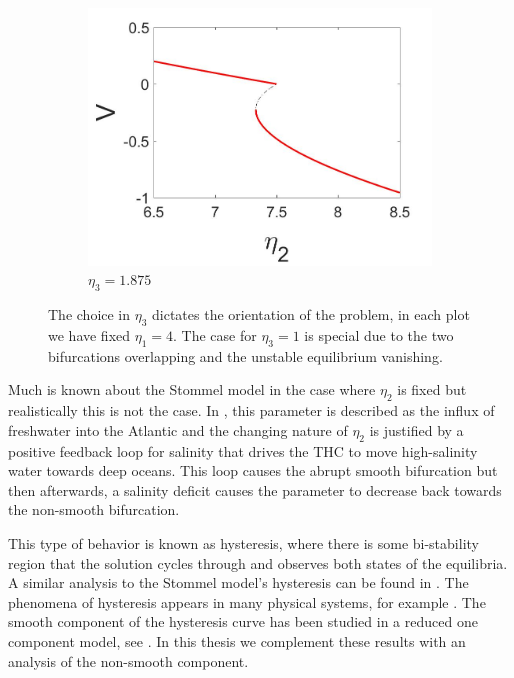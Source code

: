 \begin{figure}[H]
\begin{subfigure}{.5\textwidth}
 \includegraphics[width=\linewidth]{intro/V_bif_reverse.jpg}
 \caption{$\eta_3=1.875$}
\end{subfigure}
\caption{The choice in $\eta_3$ dictates the orientation of the problem, in each plot we have fixed $\eta_1=4$. The case for $\eta_3=1$ is special due to the two bifurcations overlapping and the unstable equilibrium vanishing.}
\label{fig:Stommel_bif_plots}
\end{figure}

\indent Much is known about the Stommel model in the case where $\eta_2$ is fixed but realistically this is not the case. In \cite{rahmstorf2000thermohaline}, this parameter is described as the influx of freshwater into the Atlantic and the changing nature of $\eta_2$ is justified by a positive feedback loop for salinity that drives the THC to move high-salinity water towards deep oceans. This loop causes the abrupt smooth bifurcation but then afterwards, a salinity deficit causes the parameter to decrease back towards the non-smooth bifurcation.

\indent This type of behavior is known as hysteresis, where there is some bi-stability region that the solution cycles through and observes both states of the equilibria. A similar analysis to the Stommel model's hysteresis can be found in \cite{roberts2017relaxation}. The phenomena of hysteresis appears in many physical systems, for example \cite{jung1990scaling,hohl1995scaling,joshi2005dynamical}. The smooth component of the hysteresis curve has been studied in a reduced one component model, see \cite{zhu2015tipping}. In this thesis we complement these results with an analysis of the non-smooth component.

